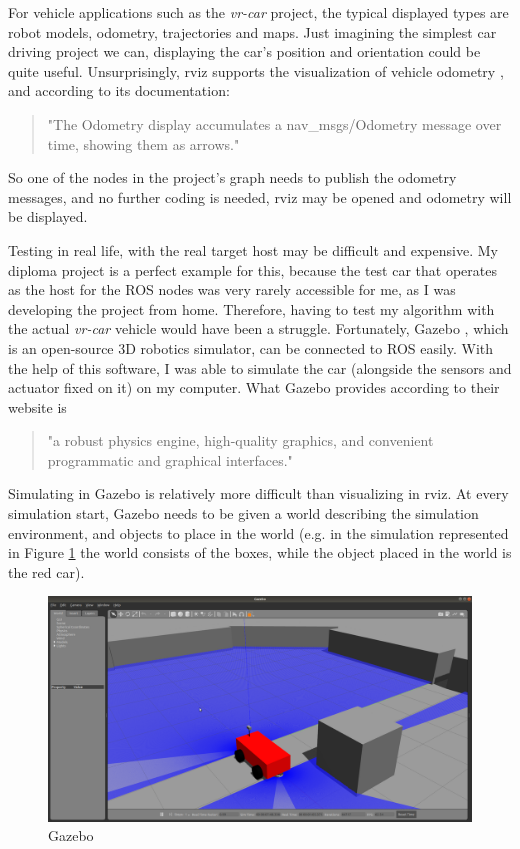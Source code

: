 For vehicle applications such as the \textit{vr-car} project, the typical displayed types are robot models, odometry, trajectories and maps. Just imagining the simplest car driving project we can, displaying the car's position and orientation could be quite useful. Unsurprisingly, rviz supports the visualization of vehicle odometry \cite{ros_rviz_Odometry}, and according to its documentation:

\begin{quote}
"The Odometry display accumulates a nav\_msgs/Odometry \cite{ros_msg_Odometry} message over time, showing them as arrows."
\end{quote}

So one of the nodes in the project's graph needs to publish the odometry messages, and no further coding is needed, rviz may be opened and odometry will be displayed.

Testing in real life, with the real target host may be difficult and expensive. My diploma project is a perfect example for this, because the test car that operates as the host for the ROS nodes was very rarely accessible for me, as I was developing the project from home. Therefore, having to test my algorithm with the actual \textit{vr-car} vehicle would have been a struggle. Fortunately, Gazebo \cite{gazebo}, which is an open-source 3D robotics simulator, can be connected to ROS easily. With the help of this software, I was able to simulate the car (alongside the sensors and actuator fixed on it) on my computer. What Gazebo provides according to their website is

\begin{quote}
"a robust physics engine, high-quality graphics, and convenient programmatic and graphical interfaces."
\end{quote}

Simulating in Gazebo is relatively more difficult than visualizing in rviz. At every simulation start, Gazebo needs to be given a world describing the simulation environment, and objects to place in the world (e.g. in the simulation represented in Figure \ref{gazebo} the world consists of the boxes, while the object placed in the world is the red car).

\begin{figure}[!ht]
	\centering
	\includegraphics[width=\textwidth]{figures/raw/gazebo.png}
	\caption{Gazebo}
	\label{gazebo}
\end{figure}

